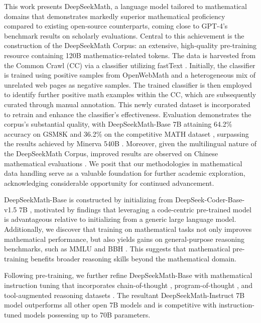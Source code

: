This work presents DeepSeekMath, a language model tailored to mathematical domains that demonstrates markedly superior mathematical proficiency compared to existing open-source counterparts, coming close to GPT-4's benchmark results on scholarly evaluations. Central to this achievement is the construction of the DeepSeekMath Corpus: an extensive, high-quality pre-training resource containing 120B mathematics-related tokens. The data is harvested from the Common Crawl (CC) via a classifier utilizing fastText \citep{joulin2016fasttext}. Initially, the classifier is trained using positive samples from OpenWebMath \citep{openwebmath} and a heterogeneous mix of unrelated web pages as negative samples. The trained classifier is then employed to identify further positive math examples within the CC, which are subsequently curated through manual annotation. This newly curated dataset is incorporated to retrain and enhance the classifier's effectiveness. Evaluation demonstrates the corpus’s substantial quality, with DeepSeekMath-Base 7B attaining 64.2\% accuracy on GSM8K \citep{gsm8k} and 36.2\% on the competitive MATH dataset \citep{MATH}, surpassing the results achieved by Minerva 540B \citep{minerva}. Moreover, given the multilingual nature of the DeepSeekMath Corpus, improved results are observed on Chinese mathematical evaluations \citep{wei2023cmath,agieval}. We posit that our methodologies in mathematical data handling serve as a valuable foundation for further academic exploration, acknowledging considerable opportunity for continued advancement.

DeepSeekMath-Base is constructed by initializing from DeepSeek-Coder-Base-v1.5 7B \citep{deepseek-coder}, motivated by findings that leveraging a code-centric pre-trained model is advantageous relative to initializing from a generic large language model. Additionally, we discover that training on mathematical tasks not only improves mathematical performance, but also yields gains on general-purpose reasoning benchmarks, such as MMLU \citep{mmlu} and BBH \citep{bbh}. This suggests that mathematical pre-training benefits broader reasoning skills beyond the mathematical domain.

Following pre-training, we further refine DeepSeekMath-Base with mathematical instruction tuning that incorporates chain-of-thought \citep{cot}, program-of-thought \citep{pot,pal}, and tool-augmented reasoning datasets \citep{tora}. The resultant DeepSeekMath-Instruct 7B model outperforms all other open 7B models and is competitive with instruction-tuned models possessing up to 70B parameters.

